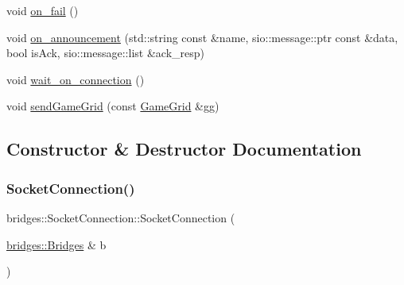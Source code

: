 \begin{DoxyCompactItemize}
\item 
void \hyperlink{classbridges_1_1_socket_connection_abd5e1625888e54871d9c605c5f81c98c}{on\+\_\+fail} ()
\item 
void \hyperlink{classbridges_1_1_socket_connection_a50b2ed74fe45e3ea9bf5141c01837f7c}{on\+\_\+announcement} (std\+::string const \&name, sio\+::message\+::ptr const \&data, bool is\+Ack, sio\+::message\+::list \&ack\+\_\+resp)
\item 
void \hyperlink{classbridges_1_1_socket_connection_a17902452eaf3c292be57573a507d43cc}{wait\+\_\+on\+\_\+connection} ()
\item 
void \hyperlink{classbridges_1_1_socket_connection_af947b550051476f3e92b550103a42c44}{send\+Game\+Grid} (const \hyperlink{classbridges_1_1_game_grid}{Game\+Grid} \&gg)
\end{DoxyCompactItemize}


\subsection{Constructor \& Destructor Documentation}
\mbox{\label{classbridges_1_1_socket_connection_af8d4af3664ff3d4a2ca52aec5138b05b}} 
\subsubsection{\texorpdfstring{Socket\+Connection()}{SocketConnection()}}
{\footnotesize\ttfamily bridges\+::\+Socket\+Connection\+::\+Socket\+Connection (\begin{DoxyParamCaption}\item[{\hyperlink{classbridges_1_1_bridges}{bridges\+::\+Bridges} \&}]{b }\end{DoxyParamCaption})\hspace{0.3cm}{\ttfamily [inline]}}

\mbox{\label{classbridges_1_1_socket_connection_aa5810b0c978315c18722e53f33622dfd}} 

